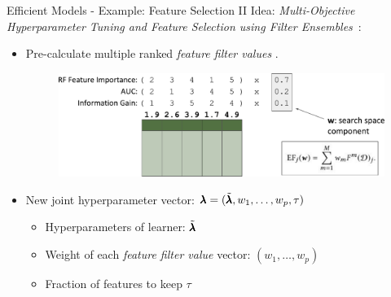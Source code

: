 \begin{frame}{Efficient Models - Example: Feature Selection II}
Idea: \emph{Multi-Objective Hyperparameter Tuning and Feature Selection  using Filter Ensembles}~:


  \begin{itemize}
    \item Pre-calculate multiple ranked \emph{feature filter values} .
    
    \begin{figure}
      \centering
      \includegraphics[width = 0.7\linewidth]{images/mosmafs_presentation_p39.pdf}
    \end{figure}

    \item New joint hyperparameter vector: $\pmb{\lambda} = (\tilde{\pmb{\lambda}}, w_1, \ldots, w_p ,\tau )$
    \begin{itemize}
      \item Hyperparameters of learner: $\tilde{\pmb{\lambda}}$
      \item Weight of each \emph{feature filter value} vector: $(w_1, \ldots, w_p)$
      \item Fraction of features to keep $\tau$
    \end{itemize}
    
  \end{itemize}  

\end{frame}

